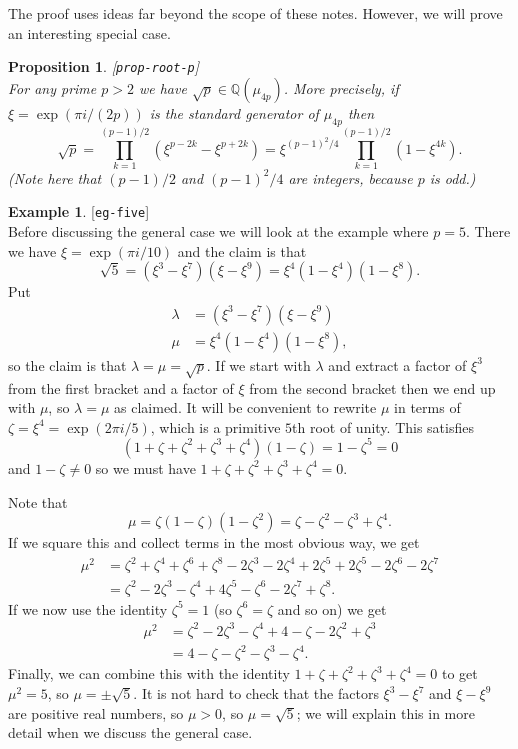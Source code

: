 \documentclass{amsart}
\newcommand{\lbl}[1]{\label{#1}\textup{[\texttt{#1}]}\ \\}
\newcommand{\lbl}{\label}
\newcommand{\Q}         {{\mathbb{Q}}}
\newcommand{\zt}        {\zeta}
\newcommand{\lm}        {\lambda}
\renewcommand{\:}{\colon}
\newtheorem{proposition}[theorem]{Proposition}
\theoremstyle{definition}
\newtheorem{example}[theorem]{Example}
\begin{document}
The proof uses ideas far beyond the scope of these notes.  However, we
will prove an interesting special case.

\begin{proposition}\lbl{prop-root-p}
 For any prime $p>2$ we have $\sqrt{p}\in\Q(\mu_{4p})$.  More
 precisely, if $\xi=\exp(\pi i/(2p))$ is the standard generator of
 $\mu_{4p}$ then 
 \[ \sqrt{p} = \prod_{k=1}^{(p-1)/2} (\xi^{p-2k}-\xi^{p+2k}) = 
     \xi^{(p-1)^2/4} \prod_{k=1}^{(p-1)/2} (1-\xi^{4k}).
 \]
 (Note here that $(p-1)/2$ and $(p-1)^2/4$ are integers, because $p$
 is odd.)
\end{proposition}

\begin{example}\lbl{eg-five}
 Before discussing the general case we will look at the example where
 $p=5$.  There we have $\xi=\exp(\pi i/10)$ and the claim is that
 \[ \sqrt{5} = (\xi^3-\xi^7)(\xi-\xi^9) = \xi^4(1-\xi^4)(1-\xi^8). \]
 Put
 \begin{align*}
  \lm &= (\xi^3-\xi^7)(\xi-\xi^9) \\
  \mu &= \xi^4(1-\xi^4)(1-\xi^8),
 \end{align*}
 so the claim is that $\lm=\mu=\sqrt{p}$.  If we start with $\lm$ and
 extract a factor of $\xi^3$ from the first bracket and a factor of
 $\xi$ from the second bracket then we end up with $\mu$, so $\lm=\mu$
 as claimed.  It will be convenient to rewrite $\mu$ in terms of
 $\zt=\xi^4=\exp(2\pi i/5)$, which is a primitive $5$th root of
 unity.  This satisfies 
 \[ (1+\zt+\zt^2+\zt^3+\zt^4)(1-\zt)=1-\zt^5=0 \]
 and $1-\zt\neq 0$ so we must have $1+\zt+\zt^2+\zt^3+\zt^4=0$.

 Note that 
 \[ \mu = \zt(1-\zt)(1-\zt^2) = \zt-\zt^2-\zt^3+\zt^4. \]
 If we square this and collect terms in the most obvious way, we get 
 \begin{align*}
  \mu^2 &= \zt^2+\zt^4+\zt^6+\zt^8
            -2\zt^3-2\zt^4+2\zt^5+2\zt^5-2\zt^6-2\zt^7 \\
        &= \zt^2-2\zt^3-\zt^4+4\zt^5-\zt^6-2\zt^7+\zt^8.
 \end{align*}
 If we now use the identity $\zt^5=1$ (so $\zt^6=\zt$ and so on) we
 get 
 \begin{align*}
  \mu^2 &= \zt^2-2\zt^3-\zt^4+4-\zt-2\zt^2+\zt^3 \\
   &= 4-\zt-\zt^2-\zt^3-\zt^4.
 \end{align*}
 Finally, we can combine this with the identity 
 $1+\zt+\zt^2+\zt^3+\zt^4=0$ to get $\mu^2=5$, so $\mu=\pm\sqrt{5}$.
 It is not hard to check that the factors $\xi^3-\xi^7$ and
 $\xi-\xi^9$ are positive real numbers, so $\mu>0$, so $\mu=\sqrt{5}$;
 we will explain this in more detail when we discuss the general case.
\end{example}	
\end{document}
